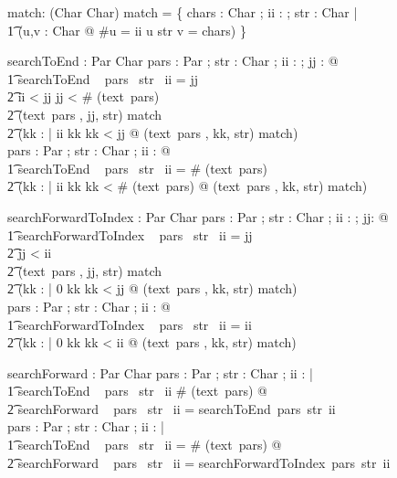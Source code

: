 \documentclass{article}
\begin{document}
\begin{axdef}
	match: \power (\seq Char \cross \nat \cross \seq Char)
\where
	match = \{ chars : \seq Char ; ii : \nat ; str : \seq Char | \\
\t1	(\exists u,v : \seq Char @ \#u = ii \land u \cat str \cat v = chars) \} 
\end{axdef}

\begin{axdef}
	searchToEnd : \seq Par \fun \seq Char \fun \nat \fun \nat
\where
	\forall pars : \seq Par ; str : \seq Char ; ii : \nat ; jj : \nat @ \\
	\t1 searchToEnd ~ pars ~str ~ii = jj \iff \\
	\t2 ii < jj \land jj < \# (text~pars) \land {} \\
	\t2  (text~pars , jj, str) \in match \land {} \\
	\t2  (\forall kk : \nat | ii \leq kk \land kk < jj @ (text~pars , kk, str) \notin match) \\
	\forall pars : \seq Par ; str : \seq Char ; ii : \nat @ \\
	\t1 searchToEnd ~ pars ~str ~ii = \# (text~pars) \iff \\
	\t2  (\forall kk : \nat | ii \leq kk \land kk < \# (text~pars) @ (text~pars , kk, str) \notin match) \\
\end{axdef}

\begin{axdef}
	searchForwardToIndex : \seq Par \fun \seq Char \fun \nat \fun \nat
\where
	\forall pars : \seq Par ; str : \seq Char ; ii : \nat ; jj: \nat @ \\
	\t1 searchForwardToIndex ~ pars ~str ~ii = jj \iff \\
	\t2 jj < ii \land {} \\
	\t2  (text~pars , jj, str) \in match \land {} \\
	\t2  (\forall kk : \nat | 0 \leq kk \land kk < jj @ (text~pars , kk, str) \notin match) \\
	\forall pars : \seq Par ; str : \seq Char ; ii : \nat @ \\
	\t1 searchForwardToIndex ~ pars ~str ~ii = ii \iff \\
	\t2  (\forall kk : \nat | 0 \leq kk \land kk < ii @ (text~pars , kk, str) \notin match)
\end{axdef}

\begin{axdef}
	searchForward : \seq Par \fun \seq Char \fun \nat \fun \nat
\where
	\forall pars : \seq Par ; str : \seq Char ; ii : \nat | \\
	\t1 searchToEnd ~ pars ~str ~ii \neq \# (text~pars) @ \\
	\t2  searchForward ~ pars ~str ~ii = searchToEnd~pars~str~ii \\
	\forall pars : \seq Par ; str : \seq Char ; ii : \nat | \\
	\t1 searchToEnd ~ pars ~str ~ii = \# (text~pars) @ \\
	\t2  searchForward ~ pars ~str ~ii = searchForwardToIndex~pars~str~ii 
\end{axdef}
\end{document}
